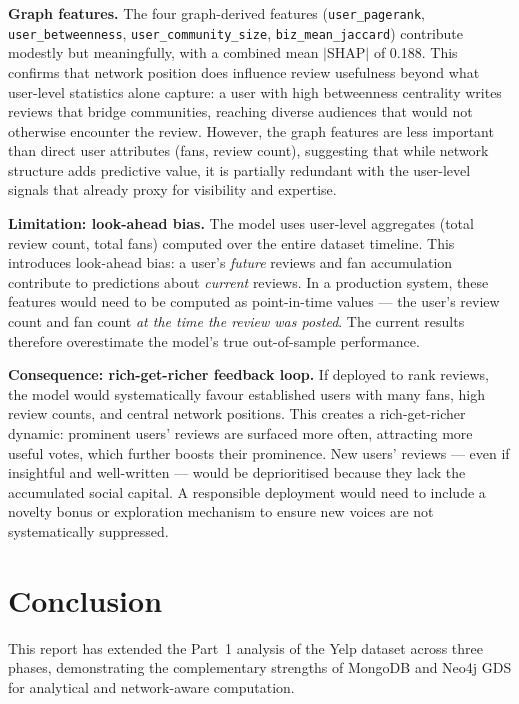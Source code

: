 \documentclass[11pt]{article}
\begin{document}
\textbf{Graph features.} The four graph-derived features (\texttt{user\_pagerank}, \texttt{user\_betweenness}, \texttt{user\_community\_size}, \texttt{biz\_mean\_jaccard}) contribute modestly but meaningfully, with a combined mean $|$SHAP$|$ of 0.188. This confirms that network position does influence review usefulness beyond what user-level statistics alone capture: a user with high betweenness centrality writes reviews that bridge communities, reaching diverse audiences that would not otherwise encounter the review. However, the graph features are less important than direct user attributes (fans, review count), suggesting that while network structure adds predictive value, it is partially redundant with the user-level signals that already proxy for visibility and expertise.

\textbf{Limitation: look-ahead bias.} The model uses user-level aggregates (total review count, total fans) computed over the entire dataset timeline. This introduces look-ahead bias: a user's \emph{future} reviews and fan accumulation contribute to predictions about \emph{current} reviews. In a production system, these features would need to be computed as point-in-time values --- the user's review count and fan count \emph{at the time the review was posted}. The current results therefore overestimate the model's true out-of-sample performance.

\textbf{Consequence: rich-get-richer feedback loop.} If deployed to rank reviews, the model would systematically favour established users with many fans, high review counts, and central network positions. This creates a rich-get-richer dynamic: prominent users' reviews are surfaced more often, attracting more useful votes, which further boosts their prominence. New users' reviews --- even if insightful and well-written --- would be deprioritised because they lack the accumulated social capital. A responsible deployment would need to include a novelty bonus or exploration mechanism to ensure new voices are not systematically suppressed.

\clearpage
\section{Conclusion}

This report has extended the Part~1 analysis of the Yelp dataset across three phases, demonstrating the complementary strengths of MongoDB and Neo4j GDS for analytical and network-aware computation.
\end{document}
